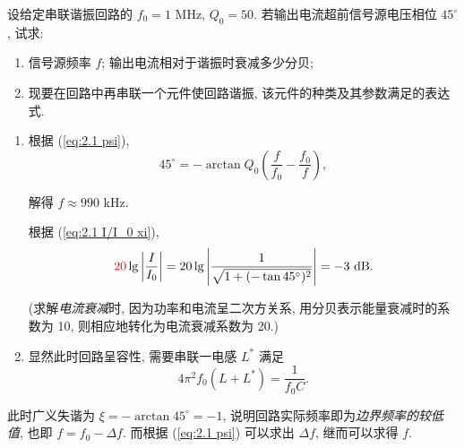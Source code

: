 \begin{exampleprob}
    设给定串联谐振回路的 $f_0=1$ MHz, $Q_0=50$. 若输出电流超前信号源电压相位 $45^\circ$, 试求:

    \begin{enumerate}
        \item 信号源频率 $f$; 输出电流相对于谐振时衰减多少分贝;
        \item 现要在回路中再串联一个元件使回路谐振, 该元件的种类及其参数满足的表达式.
    \end{enumerate}

    \begin{solution}[1]
        \begin{enumerate}
            \item 根据 (\ref{eq:2.1 psi}),
                  \begin{equation*}
                      45^\circ=-\arctan Q_0\left(\frac{f}{f_0}-\frac{f_0}{f}\right),
                  \end{equation*}

                  解得 $f\approx 990$ kHz.

                  根据 (\ref{eq:2.1 I/I_0 xi}),
                  \begin{equation*}
                      {\color{red} 20}\lg\left|\frac{I}{I_0}\right|=20\lg\left|\frac{1}{\sqrt{1+(-\tan 45^\circ)^2}}\right|=-3\ \mathrm{dB}.
                  \end{equation*}

                  (求解\textit{电流衰减}时, 因为功率和电流呈二次方关系, 用分贝表示能量衰减时的系数为 10, 则相应地转化为电流衰减系数为 20.)
            \item 显然此时回路呈容性, 需要串联一电感 $L^*$ 满足
                  \begin{equation*}
                      4\pi^2 f_0(L+L^*)=\frac{1}{f_0 C}.
                  \end{equation*}
        \end{enumerate}
    \end{solution}

    \begin{solution}[2]
        此时广义失谐为 $\xi=-\arctan 45^\circ=-1$, 说明回路实际频率即为\textit{边界频率的较低值}, 也即 $f=f_0-\Delta f$. 而根据 (\ref{eq:2.1 psi}) 可以求出 $\Delta f$, 继而可以求得 $f$.
    \end{solution}
\end{exampleprob}
